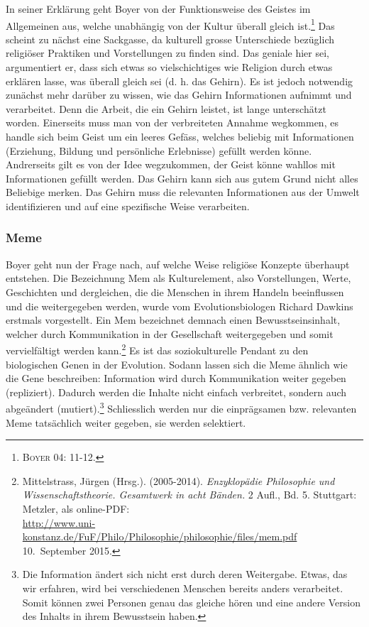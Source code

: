 In seiner Erklärung geht Boyer von der Funktionsweise des Geistes im Allgemeinen aus, welche unabhängig von der Kultur überall gleich ist.\footnote{\textsc{Boyer 04: 11-12.}} Das scheint zu nächst eine Sackgasse, da kulturell grosse Unterschiede bezüglich religiöser Praktiken und Vorstellungen zu finden sind. Das geniale hier sei, argumentiert er, dass sich etwas so vielschichtiges wie Religion durch etwas erklären lasse, was überall gleich sei (d. h. das Gehirn). Es ist jedoch notwendig zunächst mehr darüber zu wissen, wie das Gehirn Informationen aufnimmt und verarbeitet. Denn die Arbeit, die ein Gehirn leistet, ist lange unterschätzt worden. Einerseits muss man von der verbreiteten Annahme wegkommen, es handle sich beim Geist um ein leeres Gefäss, welches beliebig mit Informationen (Erziehung, Bildung und persönliche Erlebnisse) gefüllt werden könne. Andrerseits gilt es von der Idee wegzukommen, der Geist könne wahllos mit Informationen gefüllt werden. Das Gehirn kann sich aus gutem Grund nicht alles Beliebige merken. Das Gehirn muss die relevanten Informationen aus der Umwelt identifizieren und auf eine spezifische Weise verarbeiten. 

\subsubsection{Meme}
Boyer geht nun der Frage nach, auf welche Weise religiöse Konzepte überhaupt entstehen. Die Bezeichnung Mem als Kulturelement, also Vorstellungen, Werte, Geschichten und dergleichen, die die Menschen in ihrem Handeln beeinflussen und die weitergegeben werden, wurde vom Evolutionsbiologen Richard Dawkins erstmals vorgestellt. Ein Mem bezeichnet demnach einen Bewusstseinsinhalt, welcher durch Kommunikation in der Gesellschaft weitergegeben und somit vervielfältigt werden kann.\footnote{Mittelstrass, Jürgen (Hrsg.). (2005-2014). \emph{Enzyklopädie Philosophie und Wissenschaftstheorie. Gesamtwerk in acht Bänden.} 2 Aufl., Bd. 5. Stuttgart: Metzler, als online-PDF:\\ \url{http://www.uni-konstanz.de/FuF/Philo/Philosophie/philosophie/files/mem.pdf} 10.~September 2015.} Es ist das soziokulturelle Pendant zu den bio\-logischen Genen in der Evolution. Sodann lassen sich die Meme ähnlich wie die Gene beschreiben: Information wird durch Kommunikation weiter gegeben (repliziert). Dadurch werden die Inhalte nicht einfach verbreitet, sondern auch abgeändert (mutiert).\footnote{Die Information ändert sich nicht erst durch deren Weitergabe. Etwas, das wir erfahren, wird bei verschiedenen Menschen bereits anders verarbeitet. Somit können zwei Personen genau das gleiche hören und eine andere Version des Inhalts in ihrem Bewusstsein haben.} Schliesslich werden nur die einprägsamen bzw. relevanten Meme tatsächlich weiter gegeben, sie werden selektiert.

